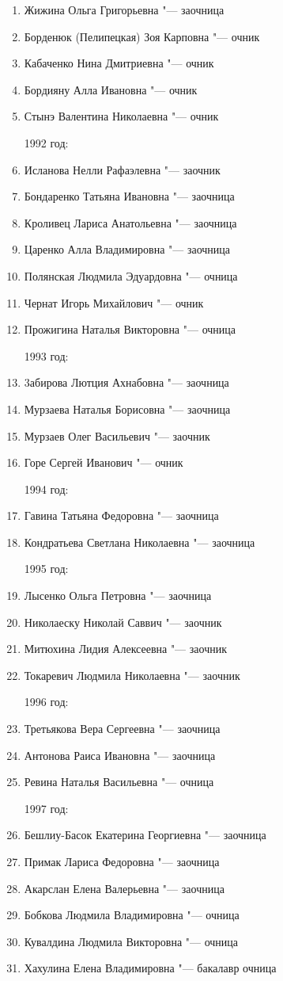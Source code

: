\begin{enumerate}[nosep]
{1991 год:}
	\item Жижина Ольга Григорьевна "--- заочница
	\item Борденюк (Пелипецкая) Зоя Карповна "--- очник
	\item Кабаченко Нина Дмитриевна "--- очник
	\item Бордияну Алла Ивановна "--- очник
	\item Стынэ Валентина Николаевна "--- очник

{1992 год:}
	\item Исланова Нелли Рафаэлевна "--- заочник
	\item Бондаренко Татьяна Ивановна "--- заочница
	\item Кроливец Лариса Анатольевна "--- заочница
	\item Царенко Алла Владимировна "--- заочница
	\item Полянская Людмила Эдуардовна "--- очница
	\item Чернат Игорь Михайлович "--- очник
	\item Прожигина Наталья Викторовна "--- очница

{1993 год:}
	\item 3абирова Лютция Ахнабовна "--- заочница
	\item Мурзаева Наталья Борисовна "--- заочница
	\item Мурзаев Олег Васильевич "--- заочник
	\item Горе Сергей Иванович "--- очник

\pagebreak

{1994 год:}
	\item Гавина Татьяна Федоровна "--- заочница
	\item Кондратьева Светлана Николаевна "--- заочница

{1995 год:}
	\item Лысенко Ольга Петровна "--- заочница
	\item Николаеску Николай Саввич "--- заочник
	\item Митюхина Лидия Алексеевна "--- заочник
	\item Токаревич Людмила Николаевна "--- заочник

{1996 год:}
	\item Третьякова Вера Сергеевна "--- заочница
	\item Антонова Раиса Ивановна "--- заочница
	\item Ревина Наталья Васильевна "--- очница

{1997 год:}
	\item Бешлиу-Басок Екатерина Георгиевна "--- заочница
	\item Примак Лариса Федоровна "--- заочница 
	\item Акарслан Елена Валерьевна "--- заочница
	\item Бобкова Людмила Владимировна "--- очница
	\item Кувалдина Людмила Викторовна "--- очница
	\item Хахулина Елена Владимировна "--- бакалавр очница


\end{enumerate}
